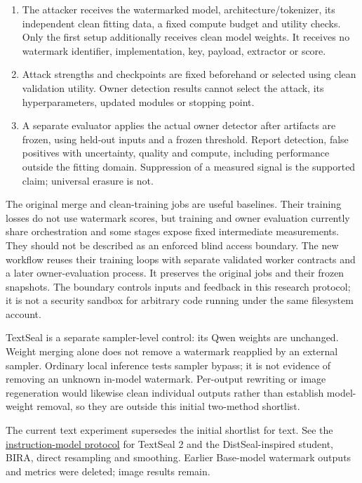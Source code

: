 \begin{enumerate}
\def\labelenumi{\arabic{enumi}.}
\tightlist
\item
  The attacker receives the watermarked model, architecture/tokenizer,
  its independent clean fitting data, a fixed compute budget and utility
  checks. Only the first setup additionally receives clean model
  weights. It receives no watermark identifier, implementation, key,
  payload, extractor or score.
\item
  Attack strengths and checkpoints are fixed beforehand or selected
  using clean validation utility. Owner detection results cannot select
  the attack, its hyperparameters, updated modules or stopping point.
\item
  A separate evaluator applies the actual owner detector after artifacts
  are frozen, using held-out inputs and a frozen threshold. Report
  detection, false positives with uncertainty, quality and compute,
  including performance outside the fitting domain. Suppression of a
  measured signal is the supported claim; universal erasure is not.
\end{enumerate}

The original merge and clean-training jobs are useful baselines. Their
training losses do not use watermark scores, but training and owner
evaluation currently share orchestration and some stages expose fixed
intermediate measurements. They should not be described as an enforced
blind access boundary. The new
\texttt{} workflow reuses their
training loops with separate validated worker contracts and a later
owner-evaluation process. It preserves the original jobs and their
frozen snapshots. The boundary controls inputs and feedback in this
research protocol; it is not a security sandbox for arbitrary code
running under the same filesystem account.

TextSeal is a separate sampler-level control: its Qwen weights are
unchanged. Weight merging alone does not remove a watermark reapplied by
an external sampler. Ordinary local inference tests sampler bypass; it
is not evidence of removing an unknown in-model watermark. Per-output
rewriting or image regeneration would likewise clean individual outputs
rather than establish model-weight removal, so they are outside this
initial two-method shortlist.

The current text experiment supersedes the initial shortlist for text.
See the \href{records/docs/instruct_watermarking.tex}{instruction-model
protocol} for TextSeal 2 and the DistSeal-inspired student, BIRA, direct
resampling and smoothing. Earlier Base-model watermark outputs and
metrics were deleted; image results remain.
